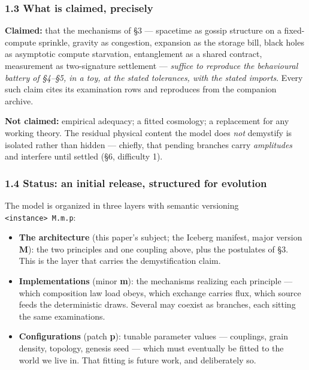 \documentclass[
  11pt,
]{article}
\providecommand{\tightlist}{%
  \setlength{\itemsep}{0pt}\setlength{\parskip}{0pt}}
\begin{document}
\subsubsection{1.3 What is claimed,
precisely}\label{what-is-claimed-precisely}

\textbf{Claimed:} that the mechanisms of \S{}3 --- spacetime as gossip
structure on a fixed-compute sprinkle, gravity as congestion, expansion
as the storage bill, black holes as asymptotic compute starvation,
entanglement as a shared contract, measurement as two-signature
settlement --- \emph{suffice to reproduce the behavioural battery of
\S{}4--\S{}5, in a toy, at the stated tolerances, with the stated imports}.
Every such claim cites its examination rows and reproduces from the
companion archive.

\textbf{Not claimed:} empirical adequacy; a fitted cosmology; a
replacement for any working theory. The residual physical content the
model does \emph{not} demystify is isolated rather than hidden ---
chiefly, that pending branches carry \emph{amplitudes} and interfere
until settled (\S{}6, difficulty 1).

\subsubsection{1.4 Status: an initial release, structured for
evolution}\label{status-an-initial-release-structured-for-evolution}

The model is organized in three layers with semantic versioning
\texttt{\textless{}instance\textgreater{}\ M.m.p}:

\begin{itemize}
\tightlist
\item
  \textbf{The architecture} (this paper's subject; the Iceberg manifest,
  major version \textbf{M}): the two principles and one coupling above,
  plus the postulates of \S{}3. This is the layer that carries the
  demystification claim.
\item
  \textbf{Implementations} (minor \textbf{m}): the mechanisms realizing
  each principle --- which composition law load obeys, which exchange
  carries flux, which source feeds the deterministic draws. Several may
  coexist as branches, each sitting the same examinations.
\item
  \textbf{Configurations} (patch \textbf{p}): tunable parameter values
  --- couplings, grain density, topology, genesis seed --- which must
  eventually be fitted to the world we live in. That fitting is future
  work, and deliberately so.
\end{itemize}
\end{document}
